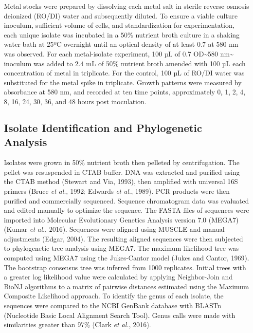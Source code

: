 \documentclass[ms, hidelinks]{uncgdissertationexp3}
\theoremstyle{plain}
\theoremstyle{definition}
\theoremstyle{remark}
\begin{document}
Metal stocks were prepared by dissolving each metal salt in sterile reverse osmosis deionized (RO/DI) water and subsequently diluted. To ensure a viable culture inoculum, sufficient volume of cells, and standardization for experimentation, each unique isolate was incubated in a 50\% nutrient broth culture in a shaking water bath at 25ºC overnight until an optical density of at least 0.7 at 580 nm was observed. For each metal-isolate experiment, 100 µL of 0.7 OD\textasciitilde580 nm\textasciitilde{} inoculum was added to 2.4 mL of 50\% nutrient broth amended with 100 µL each concentration of metal in triplicate. For the control, 100 µL of RO/DI water was substituted for the metal spike in triplicate. Growth patterns were measured by absorbance at 580 nm, and recorded at ten time points, approximately 0, 1, 2, 4, 8, 16, 24, 30, 36, and 48 hours post inoculation.


\subsection{Isolate Identification and Phylogenetic Analysis}\label{isolate-identification-and-phylogenetic-analysis}

Isolates were grown in 50\% nutrient broth then pelleted by centrifugation. The pellet was resuspended in CTAB buffer. DNA was extracted and purified using the CTAB method (Stewart and Via, 1993), then amplified with universal 16S primers (Bruce \emph{et al.}, 1992; Edwards \emph{et al.}, 1989). PCR products were then purified and commercially sequenced. Sequence chromatogram data was evaluated and edited manually to optimize the sequence. The FASTA files of sequences were imported into Molecular Evolutionary Genetics Analysis version 7.0 (MEGA7) (Kumar \emph{et al.}, 2016). Sequences were aligned using MUSCLE and manual adjustments (Edgar, 2004). The resulting aligned sequences were then subjected to phylogenetic tree analysis using MEGA7. The maximum likelihood tree was computed using MEGA7 using the Jukes-Cantor model (Jukes and Cantor, 1969). The bootstrap consensus tree was inferred from 1000 replicates. Initial trees with a greater log likelihood value were calculated by applying Neighbor-Join and BioNJ algorithms to a matrix of pairwise distances estimated using the Maximum Composite Likelihood approach. To identify the genus of each isolate, the sequences were compared to the NCBI GenBank database with BLASTn (Nucleotide Basic Local Alignment Search Tool). Genus calls were made with similarities greater than 97\% (Clark \emph{et al.}, 2016).
\end{document}
